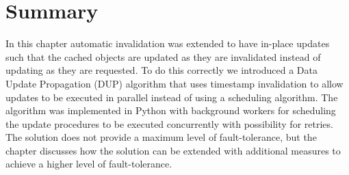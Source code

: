
\section{Summary}
\label{sec:summary}

In this chapter automatic invalidation was extended to have in-place updates such that the cached objects are updated as they are invalidated instead of updating as they are requested. To do this correctly we introduced a Data Update Propagation (DUP) algorithm that uses timestamp invalidation to allow updates to be executed in parallel instead of using a scheduling algorithm. The algorithm was implemented in Python with background workers for scheduling the update procedures to be executed concurrently with possibility for retries. The solution does not provide a maximum level of fault-tolerance, but the chapter discusses how the solution can be extended with additional measures to achieve a higher level of fault-tolerance.


